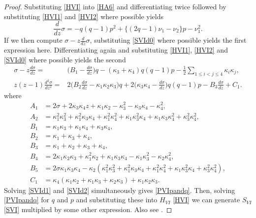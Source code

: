 \documentclass[12pt]{article}
\numberwithin{figure}{section}
\numberwithin{equation}{section}
\numberwithin{table}{section}
\begin{document}
\begin{proof}
Substituting \eqref{HVI} into \eqref{HA6} and differentiating twice followed by substituting \eqref{HVI1} and \eqref{HVI2} where possible yields
\begin{equation}
\frac{d}{dz}\sigma=-q(q-1)p^2+\big\{(2q-1)\nu_1-\nu_2\big\}p-\nu_1^2.\label{SVId0}
\end{equation}
If we then compute $\sigma-z\frac{d}{dz}\sigma$, substituting \eqref{SVId0} where possible yields the first expression here. Differentiating again and substituting \eqref{HVI1}, \eqref{HVI2} and \eqref{SVId0} where possible yields the second
\begin{subequations}
\begin{align}
\sigma-z\frac{d\sigma}{dz}=&\bigg(B_1-\frac{d\sigma}{dz}\bigg)q-(\kappa_3+\kappa_4)q(q-1)p-\tfrac{1}{2}\!\!\!\!\!\!\sum_{1\leq i<j\leq4}\!\!\!\!\!\kappa_i\kappa_j,\label{SVId1}\\
z(z-1)\frac{d^2\sigma}{dz^2}=&2\bigg(B_2\frac{d\sigma}{dz}-\kappa_1\kappa_2\kappa_3\bigg)q+2\bigg(\kappa_3\kappa_4-\frac{d\sigma}{dz}\bigg)q(q-1)p-B_3\frac{d\sigma}{dz}+C_1.\label{SVId2}
\end{align}
\end{subequations}
where
\begin{align*}
A_1&=2\sigma+2\kappa_3\kappa_4z+\kappa_1\kappa_2-\kappa_3^2-\kappa_3\kappa_4-\kappa_4^2,\\
A_2&=\kappa_1^2\kappa_3^2+\kappa_1^2\kappa_3\kappa_4+\kappa_1^2\kappa_4^2+\kappa_1\kappa_3^2\kappa_4+\kappa_1\kappa_3\kappa_4^2+\kappa_3^2\kappa_4^2,\\
B_1&=\kappa_1\kappa_3+\kappa_1\kappa_4+\kappa_3\kappa_4,\\
B_2&=\kappa_1+\kappa_3+\kappa_4,\\
B_3&=\kappa_1+\kappa_2+\kappa_3+\kappa_4,\\
B_4&=2\kappa_1\kappa_2\kappa_3+\kappa_1^2\kappa_2+\kappa_1\kappa_3\kappa_4-\kappa_1\kappa_3^2-\kappa_2\kappa_4^2,\\
B_5&=2\sigma \kappa_1\kappa_3\kappa_4-\kappa_2(\kappa_1^2\kappa_3^2+\kappa_1^2\kappa_3\kappa_4+\kappa_1^2\kappa_4^2+\kappa_1\kappa_3^2\kappa_4+\kappa_3^2\kappa_4^2),\\
C_1&=\kappa_4(\kappa_1\kappa_2+\kappa_1\kappa_3+\kappa_2\kappa_3)+\kappa_1\kappa_2\kappa_3.
\end{align*}
Solving \eqref{SVId1} and \eqref{SVId2} simultaneously gives \eqref{PVIpandq}.
Then, solving \eqref{PVIpandq} for $q$ and $p$ and substituting these into $H_{VI}$ \eqref{HVI} we can generate $S_{VI}$ \eqref{SVI} multiplied by some other expression.
Also see \cite{P:146:337}.
\end{proof}
\end{document}

